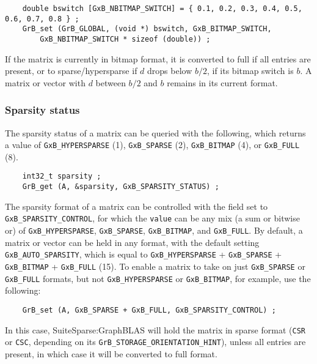 {\footnotesize
\begin{verbatim}
    double bswitch [GxB_NBITMAP_SWITCH] = { 0.1, 0.2, 0.3, 0.4, 0.5, 0.6, 0.7, 0.8 } ;
    GrB_set (GrB_GLOBAL, (void *) bswitch, GxB_BITMAP_SWITCH,
        GxB_NBITMAP_SWITCH * sizeof (double)) ;
\end{verbatim}
}

If the matrix is currently in bitmap format, it is converted to full if all
entries are present, or to sparse/hypersparse if $d$ drops below $b/2$, if its
bitmap switch is $b$.  A matrix or vector with $d$ between $b/2$ and $b$
remains in its current format.

\subsubsection{Sparsity status}
\label{sparsity_status}

The sparsity status of a matrix can be queried with the following, which
returns a value of \verb'GxB_HYPERSPARSE' (1), \verb'GxB_SPARSE' (2),
\verb'GxB_BITMAP' (4), or \verb'GxB_FULL' (8).

{\footnotesize
\begin{verbatim}
    int32_t sparsity ;
    GrB_get (A, &sparsity, GxB_SPARSITY_STATUS) ; \end{verbatim}}

The sparsity format of a matrix can be controlled with the field set to
\verb'GxB_SPARSITY_CONTROL', for which the \verb'value' can be any mix (a sum or bitwise
or) of \verb'GxB_HYPERSPARSE', \verb'GxB_SPARSE', \verb'GxB_BITMAP', and
\verb'GxB_FULL'.  By default, a matrix or vector can be held in any format,
with the default setting \verb'GxB_AUTO_SPARSITY', which is equal to
\verb'GxB_HYPERSPARSE' + \verb'GxB_SPARSE' + \verb'GxB_BITMAP' +
\verb'GxB_FULL' (15).  To enable a matrix to take on just \verb'GxB_SPARSE' or
\verb'GxB_FULL' formats, but not \verb'GxB_HYPERSPARSE' or \verb'GxB_BITMAP',
for example, use the following:

{\footnotesize
\begin{verbatim}
    GrB_set (A, GxB_SPARSE + GxB_FULL, GxB_SPARSITY_CONTROL) ; \end{verbatim}}

In this case, SuiteSparse:GraphBLAS will hold the matrix in sparse format
(\verb'CSR' or \verb'CSC', depending on its
\verb'GrB_STORAGE_ORIENTATION_HINT'), unless all entries are present, in which
case it will be converted to full format.

